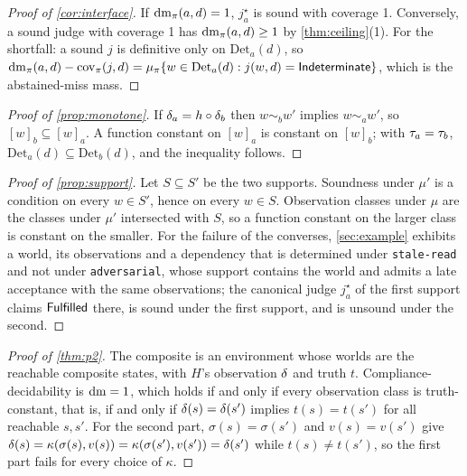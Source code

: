 \begin{proof}[Proof of \cref{cor:interface}]
If $\operatorname{dm}_\pi(a,d) = 1$, $j^\star_a$ is sound with coverage 1. Conversely, a sound judge with coverage 1 has $\operatorname{dm}_\pi(a,d) \geq 1$ by \cref{thm:ceiling}(1). For the shortfall: a sound $j$ is definitive only on $\mathrm{Det}_a(d)$, so $\operatorname{dm}_\pi(a,d) - \operatorname{cov}_\pi(j,d) = \mu_\pi\{ w \in \mathrm{Det}_a(d) : j(w,d) = \mathsf{Indeterminate} \}$, which is the abstained-miss mass.
\end{proof}

\begin{proof}[Proof of \cref{prop:monotone}]
If $\delta_a = h \circ \delta_b$ then $w \sim_b w'$ implies $w \sim_a w'$, so $[w]_b \subseteq [w]_a$. A function constant on $[w]_a$ is constant on $[w]_b$; with $\tau_a = \tau_b$, $\mathrm{Det}_a(d) \subseteq \mathrm{Det}_b(d)$, and the inequality follows.
\end{proof}

\begin{proof}[Proof of \cref{prop:support}]
Let $S \subseteq S'$ be the two supports. Soundness under $\mu'$ is a condition on every $w \in S'$, hence on every $w \in S$. Observation classes under $\mu$ are the classes under $\mu'$ intersected with $S$, so a function constant on the larger class is constant on the smaller. For the failure of the converses, \cref{sec:example} exhibits a world, its observations and a dependency that is determined under \texttt{stale-read} and not under \texttt{adversarial}, whose support contains the world and admits a late acceptance with the same observations; the canonical judge $j^\star_a$ of the first support claims $\mathsf{Fulfilled}$ there, is sound under the first support, and is unsound under the second.
\end{proof}

\begin{proof}[Proof of \cref{thm:p2}]
The composite is an environment whose worlds are the reachable composite states, with $H$'s observation $\delta$ and truth $t$. Compliance-decidability is $\operatorname{dm} = 1$, which holds if and only if every observation class is truth-constant, that is, if and only if $\delta(s) = \delta(s')$ implies $t(s) = t(s')$ for all reachable $s, s'$. For the second part, $\sigma(s) = \sigma(s')$ and $v(s) = v(s')$ give $\delta(s) = \kappa(\sigma(s), v(s)) = \kappa(\sigma(s'), v(s')) = \delta(s')$ while $t(s) \neq t(s')$, so the first part fails for every choice of $\kappa$.
\end{proof}

